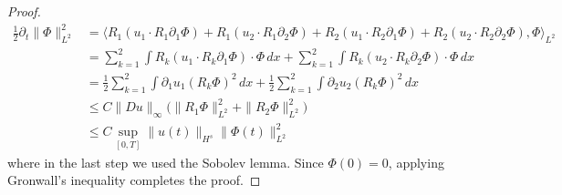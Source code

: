 \documentclass[11pt]{amsart}
\numberwithin{equation}{section}
\begin{document}
\begin{proof}
		
		\begin{align*}
		\frac{1}{2} \partial_t \|\Phi\|_{L^2}^2&=\big\langle R_1(u_1\cdot R_1\partial_1\Phi)+R_1(u_2\cdot R_1\partial_2\Phi)+R_2(u_1\cdot R_2\partial_1\Phi)+R_2(u_2\cdot R_2\partial_2\Phi),\Phi \big\rangle_{L^2}\\
		&=\sum\limits_{k=1}^{2}\int\limits R_k(u_1\cdot R_k\partial_1\Phi)\cdot \Phi\, dx+\sum\limits_{k=1}^{2}\int\limits R_k(u_2\cdot R_k\partial_2\Phi)\cdot \Phi\, dx\\
		&=\frac{1}{2}\sum\limits_{k=1}^2\int\limits \partial_1u_1 (R_k\Phi)^2 \, dx+\frac{1}{2}\sum\limits_{k=1}^2\int\limits \partial_2u_2 (R_k\Phi)^2 \, dx\\
		&\le C \|Du\|_{\infty}\Big(\|R_1\Phi\|_{L^2}^2+\|R_2\Phi\|_{L^2}^2  \Big)\\
		&\le C \sup\limits_{[0,T]}\|u(t)\|_{H^s}\|\Phi(t)\|_{L^2}^2
		\end{align*}
where in the last step we used the Sobolev lemma. Since $\Phi(0)=0$, applying Gronwall's inequality completes the proof.
	\end{proof}
\end{document}

